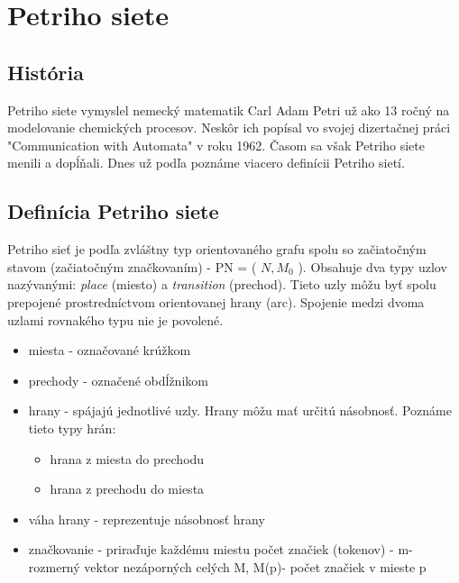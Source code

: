





\section{Petriho siete}


\subsection{História}
Petriho siete vymyslel nemecký matematik Carl Adam Petri už ako 13 ročný na modelovanie chemických procesov. Neskôr ich popísal vo svojej dizertačnej práci "Communication with Automata" \cite{petri} v roku 1962. Časom sa však Petriho siete menili a dopĺňali. Dnes už podľa \cite{gabova_kniha} poznáme viacero definícii Petriho sietí. 


\subsection{Definícia Petriho siete}
Petriho sieť je podľa  \cite{desel} zvláštny typ orientovaného grafu spolu so začiatočným stavom (začiatočným značkovaním) - PN = ( $N, M_{0}$ ). 
Obsahuje dva typy uzlov nazývanými: \emph{place}  (miesto) a \emph{transition} (prechod). Tieto uzly môžu byť spolu prepojené prostredníctvom orientovanej hrany (arc). Spojenie medzi dvoma uzlami rovnakého typu nie je povolené.
\begin{itemize}
	\item miesta - označované krúžkom 
	\item prechody - označené obdĺžnikom
	\item hrany - spájajú jednotlivé uzly. Hrany môžu mať určitú násobnosť. Poznáme tieto typy hrán: 
	\begin{itemize}
		\item hrana z miesta do prechodu
		\item hrana z prechodu do miesta
	\end{itemize}
	\item váha hrany - reprezentuje násobnosť hrany
	\item značkovanie - priraďuje každému miestu počet značiek (tokenov) - m-rozmerný vektor nezáporných celých M, M(p)- počet značiek v mieste p 
\end{itemize}




